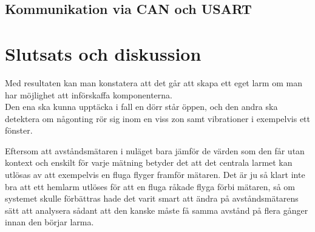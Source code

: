\documentclass{article}
\begin{document}
\subsection{Kommunikation via CAN och USART}




\section{Slutsats och diskussion}
Med resultaten kan man konstatera att det går att skapa ett eget larm om man har möjlighet att införskaffa komponenterna.\\

\noindent
Den ena ska kunna upptäcka i fall en dörr står öppen, och den andra ska detektera om någonting rör sig inom en viss zon samt vibrationer i exempelvis ett fönster. 


\noindent
Eftersom att avståndsmätaren i nuläget bara jämför de värden som den får utan kontext och enskilt för varje mätning betyder det att det centrala larmet kan utlösas av att exempelvis en fluga flyger framför mätaren.
Det är ju så klart inte bra att ett hemlarm utlöses för att en fluga råkade flyga förbi mätaren, så om systemet skulle förbättras hade det varit smart att ändra på avståndsmätarens sätt att analysera sådant att den kanske måste få samma avstånd på flera gånger innan den börjar larma.\\
\end{document}
